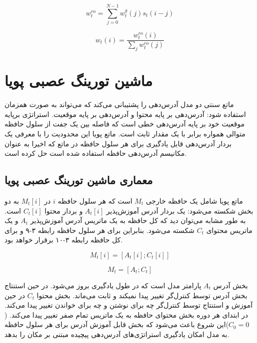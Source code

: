 \begin{equation}
w_t^{ro} = \sum_{j=0}^{N-1}w_t^g(j)s_t(i-j)
\end{equation}

\begin{equation}
w_t(i) = \frac{w_t^{ro}(i)}{\sum_j w_t^{ro}(j)}
\end{equation}

\section{ماشین تورینگ عصبی پویا}

ماتع سنتی دو مدل آدرس‌دهی را پشتیبانی می‌کند که می‌تواند به صورت همزمان استفاده شود: آدرس‌دهی بر پایه محتوا و آدرس‌دهی بر پایه موقعیت. استراتژی برپایه موقعیت خود بر پایه آدرس‌دهی خطی است که فاصله بین یک جفت از سلول حافظه متوالی همواره برابر با یک مقدار ثابت است. ماتع پویا این محدودیت را با معرفی یک بردار آدرس‌دهی قابل یادگیری برای هر سلول حافظه در ماتع که اخیرا به عنوان مکانیسم آدرس‌دهی حافظه استفاده شده است حل کرده است.\cite{gulcehre2018dynamic}

\subsection{معماری ماشین تورینگ عصبی پویا}
ماتع پویا شامل یک حافظه خارجی $M_t$ است که هر سلول حافظه $i$ در $M_t[i]$ به دو بخش شکسته می‌شود: 
یک بردار آدرس آموزش‌پذیر $A_t[i]$ و بردار محتوا $C_t[i]$ است. به طور مشابه می‌توان دید که کل حافظه به یک ماتریس آدرس آموزش‌پذیر $A_t$ و یک ماتریس محتوای $C_t$ شکسته می‌شود. بنابراین برای هر سلول حافظه رابطه ۳-۹ و برای کل حافظه رابطه ۳-۱۰ برقرار خواهد بود.\cite{gulcehre2018dynamic}

\begin{equation}
M_t[i] = [A_t[i]; C_t[i]]
\end{equation}

\begin{equation}
M_t = [A_t; C_t]
\end{equation} 

بخش آدرس $A_t$ پارامتر مدل است که در طول یادگیری بروز می‌شود. در حین استنتاج بخش آدرس توسط کنترل‌گر تغییر پیدا نمیکند و ثابت می‌ماند. بخش محتوا $C_t$ در حین آموزش و استنتاج توسط کنترل‌گر چه برای نوشتن و چه برای خواندن تغییر پیدا می‌کند. در ابتدای هر دوره بخش محتوای حافظه به یک ماتریس تمام صفر تغییر پیدا می‌کند. ($C_0 = 0$)این شروع باعث می‌شود که بخش قابل آموزش آدرس برای هر سلول حافظه به مدل امکان یادگیری استراتژی‌های آدرس‌دهی پیچیده مبتنی بر مکان را بدهد.\cite{gulcehre2018dynamic}

